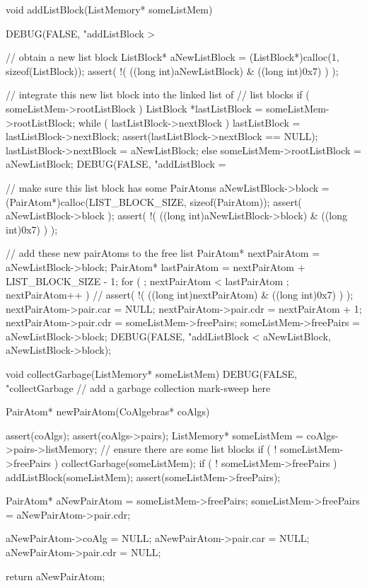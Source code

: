 void addListBlock(ListMemory* someListMem) {
  DEBUG(FALSE, "addListBlock > %

  // obtain a new list block
  ListBlock* aNewListBlock = (ListBlock*)calloc(1, sizeof(ListBlock));
  assert( !( ((long int)aNewListBlock) & ((long int)0x7) ) );

  // integrate this new list block into the linked list of
  // list blocks
  if ( someListMem->rootListBlock ) {
    ListBlock *lastListBlock = someListMem->rootListBlock;
    while ( lastListBlock->nextBlock ) {
      lastListBlock = lastListBlock->nextBlock;
    }
    assert(lastListBlock->nextBlock == NULL);
    lastListBlock->nextBlock = aNewListBlock;
  } else {
    someListMem->rootListBlock = aNewListBlock;
  }
  DEBUG(FALSE, "addListBlock = %

  // make sure this list block has some PairAtoms
  aNewListBlock->block = (PairAtom*)calloc(LIST_BLOCK_SIZE, sizeof(PairAtom));
  assert( aNewListBlock->block );
  assert( !( ((long int)aNewListBlock->block) & ((long int)0x7) ) );

  // add these new pairAtoms to the free list
  PairAtom* nextPairAtom = aNewListBlock->block;
  PairAtom* lastPairAtom = nextPairAtom + LIST_BLOCK_SIZE - 1;
  for ( ; nextPairAtom < lastPairAtom ; nextPairAtom++ ) {
//    assert( !( ((long int)nextPairAtom) & ((long int)0x7) ) );
    nextPairAtom->pair.car = NULL;
    nextPairAtom->pair.cdr = nextPairAtom + 1;
  }
  nextPairAtom->pair.cdr = someListMem->freePairs;
  someListMem->freePairs = aNewListBlock->block;
  DEBUG(FALSE, "addListBlock < %
        aNewListBlock, aNewListBlock->block);
}

void collectGarbage(ListMemory* someListMem) {
  DEBUG(FALSE, "collectGarbage %
  // add a garbage collection mark-sweep here
}

PairAtom* newPairAtom(CoAlgebras* coAlgs) {
  assert(coAlgs);
  assert(coAlgs->pairs);
  ListMemory* someListMem = coAlgs->pairs->listMemory;
  // ensure there are some list blocks
  if ( ! someListMem->freePairs ) collectGarbage(someListMem);
  if ( ! someListMem->freePairs ) addListBlock(someListMem);
  assert(someListMem->freePairs);

  PairAtom* aNewPairAtom = someListMem->freePairs;
  someListMem->freePairs = aNewPairAtom->pair.cdr;

  aNewPairAtom->coAlg    = NULL;
  aNewPairAtom->pair.car = NULL;
  aNewPairAtom->pair.cdr = NULL;

  return aNewPairAtom;
}
\stopCCode


